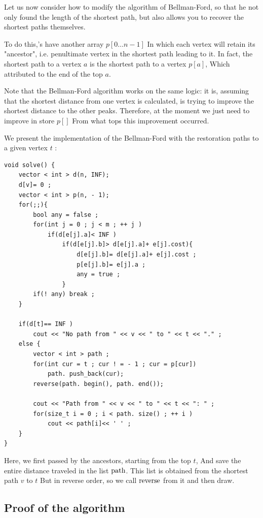 Let us now consider how to modify the algorithm of Bellman-Ford, so that he not only found the length of the shortest path, but also allows you to recover the shortest paths themselves.

To do this,'s have another array $p [0 \ldots n-1]$ In which each vertex will retain its "ancestor", i.e. penultimate vertex in the shortest path leading to it. In fact, the shortest path to a vertex $a$ is the shortest path to a vertex $p [a]$, Which attributed to the end of the top $a$.

Note that the Bellman-Ford algorithm works on the same logic: it is, assuming that the shortest distance from one vertex is calculated, is trying to improve the shortest distance to the other peaks. Therefore, at the moment we just need to improve in store $p []$ From what tops this improvement occurred.

We present the implementation of the Bellman-Ford with the restoration paths to a given vertex $t$ :

\begin{verbatim}
void solve() {
    vector < int > d(n, INF);
    d[v]= 0 ;
    vector < int > p(n, - 1);
    for(;;){
        bool any = false ;
        for(int j = 0 ; j < m ; ++ j )
            if(d[e[j].a]< INF )
                if(d[e[j].b]> d[e[j].a]+ e[j].cost){
                    d[e[j].b]= d[e[j].a]+ e[j].cost ;
                    p[e[j].b]= e[j].a ;
                    any = true ;
                }
        if(! any) break ;
    }
 
    if(d[t]== INF )
        cout << "No path from " << v << " to " << t << "." ;
    else {
        vector < int > path ;
        for(int cur = t ; cur ! = - 1 ; cur = p[cur])
            path. push_back(cur);
        reverse(path. begin(), path. end());
 
        cout << "Path from " << v << " to " << t << ": " ;
        for(size_t i = 0 ; i < path. size() ; ++ i )
            cout << path[i]<< ' ' ;
    }
} 
\end{verbatim}
Here, we first passed by the ancestors, starting from the top $t$, And save the entire distance traveled in the list $\rm path$. This list is obtained from the shortest path $v$ to $t$ But in reverse order, so we call $\rm reverse$ from it and then draw.

\subsection{ Proof of the algorithm }

